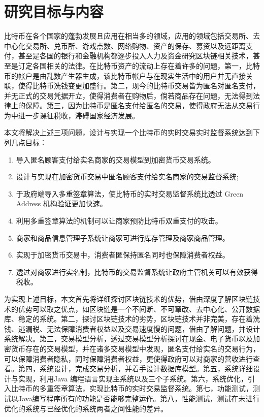 		

	\section{研究目标与内容}
	比特币在各个国家的蓬勃发展且应用在相当多的领域，应用的领域包括交易所、去中心化交易所、兑币所、游戏点数、网络购物、资产的保存、募资以及远距离支付，甚至是各国的银行和金融机构都逐步投入人力及资金研究区块链相关技术，甚至是订定各国相关的法律。在比特币资产的流动上存在着许多的问题，第一，比特币的帐户是由乱数产生器生成，该比特币帐户与在现实生活中的用户并无直接关联，使得比特币洗钱变更加盛行。第二，现今的比特币交易皆为匿名对匿名支付，并无正式的交易凭据开立，使得消费者在购物后，倘若商品存在问题，无法得到法律上的保障。第三，因为比特币是匿名支付给匿名的交易，使得政府无法从交易行为中进一步课征税收，滞碍国家经济发展。

	本文将解决上述三项问题，设计与实现一个比特币的实时交易实时监督系统达到下列几点目标：

		\begin{enumerate}
			\item 导入匿名顾客支付给实名商家的交易模型到加密货币交易系统。
			\item 设计与实现在加密货币交易中匿名顾客支付给实名商家的交易监督系统;
			\item 于政府端导入多重签章算法，使比特币的实时交易监督系统比透过 Green Address 机构验证更加快速。
			\item 利用多重签章算法的机制可以让商家预防比特币双重支付的攻击。
			\item 商家和商品信息管理⼦系统让商家可进行库存管理及商家商品管理。
			\item 实现于加密货币交易中，消费者匿保持匿名同时也保障消费者权益。
			\item 透过对商家进行实名制，比特币的交易监督系统让政府主管机关可以有效获得税收。
		\end{enumerate}

	为实现上述目标，本文首先将详细探讨区块链技术的优势，借由深度了解区块链技术的优势可以取之优点，如区块链是一个不间断、不可窜改、去中心化、公开数据库、稳定的系统。第二，探讨区块链技术的劣势，区块链技术并非完美，存在着洗钱、逃漏税、无法保障消费者权益以及交易速度慢的问题，借由了解问题，并设计系统解决。第三，交易模型分析，透过交易模型分析探讨在现金、电子货币以及加密货币存在的交易模型，并在诸多交易模型中发现，匿名支付给实名的交易行为，可以保障消费者隐私，同时保障消费者权益，更使得政府可以对商家的营收进行查看。第四，系统设计，完成交易分析，并着⼿设计数据库模型。第五，系统详细设计与实现，利⽤Java 编程语⾔实现主系统以及三个⼦系统。第六，系统优化，引入比特币的多重签章算法，实现比特币的实时交易监督系统。第七，功能测试，测试以Java编写程序所有的功能是否能够完整运作。第八，性能测试，测试在未进行优化的系统与已经优化的系统两者之间性能的差异。


